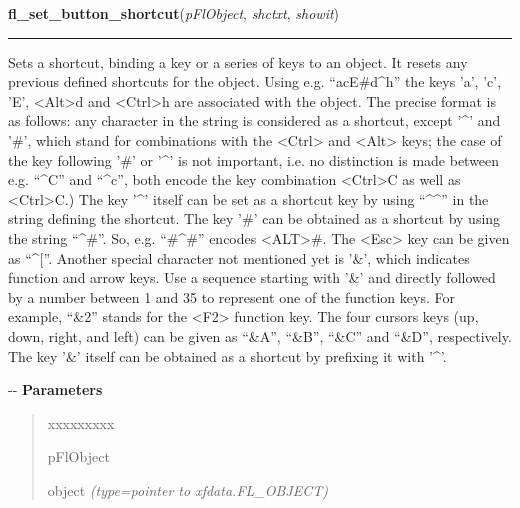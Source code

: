 \hspace{.8\funcindent}\begin{boxedminipage}{\funcwidth}

    \raggedright \textbf{fl\_set\_button\_shortcut}(\textit{pFlObject}, \textit{shctxt}, \textit{showit})

    \vspace{-1.5ex}

    \rule{\textwidth}{0.5\fboxrule}
\setlength{\parskip}{2ex}

Sets a shortcut, binding a key or a series of keys to an object. It
resets any previous defined shortcuts for the object. Using e.g. ``acE\#d\textasciicircum{}h''
the keys 'a', 'c', 'E', <Alt>d and <Ctrl>h are associated with the object.
The precise format is as follows: any character in the string is considered
as a shortcut, except '\textasciicircum{}' and '\#', which stand for combinations with the
<Ctrl> and <Alt> keys; the case of the key following '\#' or '\textasciicircum{}' is not
important, i.e. no distinction is made between e.g. ``\textasciicircum{}C'' and ``\textasciicircum{}c'', both
encode the key combination <Ctrl>C as well as <Ctrl>C.) The key '\textasciicircum{}' itself
can be set as a shortcut key by using ``\textasciicircum{}\textasciicircum{}'' in the string defining the
shortcut. The key '\#' can be obtained as a shortcut by using the string
``\textasciicircum{}\#''. So, e.g. ``\#\textasciicircum{}\#'' encodes <ALT>\#. The <Esc> key can be given as ``\textasciicircum{}{[}''.
Another special character not mentioned yet is '\&', which indicates
function and arrow keys. Use a sequence starting with '\&' and directly
followed by a number between 1 and 35 to represent one of the function
keys. For example, ``\&2'' stands for the <F2> function key. The four cursors
keys (up, down, right, and left) can be given as ``\&A'', ``\&B'', ``\&C'' and ``\&D'',
respectively. The key '\&' itself can be obtained as a shortcut by
prefixing it with '\textasciicircum{}'.

-{}-
\setlength{\parskip}{1ex}
      \textbf{Parameters}
      \vspace{-1ex}

      \begin{quote}
        \begin{Ventry}{xxxxxxxxx}

          \item[pFlObject]


object
            {\it (type=pointer to xfdata.FL\_OBJECT)}


\end{Ventry}
\end{quote}
\end{boxedminipage}
